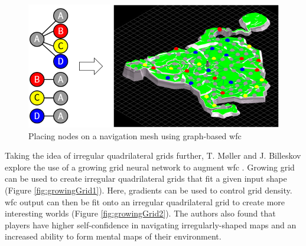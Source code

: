 \begin{figure}[H]
    \centering
    \includegraphics[width=\textwidth, height=0.3\textheight, keepaspectratio]{Images/NavigationMeshNodePlacement.png}
    \caption{Placing nodes on a navigation mesh using graph-based \acrshort{wfc} \cite{WFC_Graph-based}}
    \label{fig:navigationMeshNodePlacement}
\end{figure}

Taking the idea of irregular quadrilateral grids further, T. Møller and J. Billeskov explore the use of a growing grid neural network to augment \acrshort{wfc} \cite{WFC_Neural_Network}. Growing grid can be used to create irregular quadrilateral grids that fit a given input shape (Figure \ref{fig:growingGrid1}). Here, gradients can be used to control grid density. \acrshort{wfc} output can then be fit onto an irregular quadrilateral grid to create more interesting worlds (Figure \ref{fig:growingGrid2}). The authors also found that players have higher self-confidence in navigating irregularly-shaped maps and an increased ability to form mental maps of their environment.

